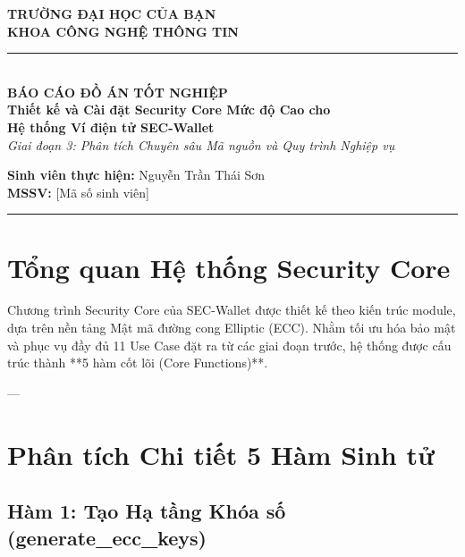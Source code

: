 \documentclass[11pt,a4paper]{article}
\begin{document}
\begin{center}
    \large \textbf{TRƯỜNG ĐẠI HỌC CỦA BẠN} \\
    \large \textbf{KHOA CÔNG NGHỆ THÔNG TIN} \\
    \vspace{0.4cm}
    \rule{\linewidth}{1pt} \\
    \vspace{0.3cm}
    \huge \textbf{BÁO CÁO ĐỒ ÁN TỐT NGHIỆP} \\
    \Large \textbf{Thiết kế và Cài đặt Security Core Mức độ Cao cho \\ Hệ thống Ví điện tử SEC-Wallet} \\
    \vspace{0.3cm}
    \textit{Giai đoạn 3: Phân tích Chuyên sâu Mã nguồn và Quy trình Nghiệp vụ} \\
    \vspace{0.4cm}
    
    \small
    \textbf{Sinh viên thực hiện:} Nguyễn Trần Thái Sơn \\
    \textbf{MSSV:} [Mã số sinh viên] \\
    \normalsize
    
    \vspace{0.2cm}
    \rule{\linewidth}{1pt}
\end{center}
\vspace{0.5cm}

\section{Tổng quan Hệ thống Security Core}
Chương trình Security Core của SEC-Wallet được thiết kế theo kiến trúc module, dựa trên nền tảng Mật mã đường cong Elliptic (ECC). Nhằm tối ưu hóa bảo mật và phục vụ đầy đủ 11 Use Case đặt ra từ các giai đoạn trước, hệ thống được cấu trúc thành **5 hàm cốt lõi (Core Functions)**. 

---

\section{Phân tích Chi tiết 5 Hàm Sinh tử}

\subsection{Hàm 1: Tạo Hạ tầng Khóa số (generate\_ecc\_keys)}
\end{document}
